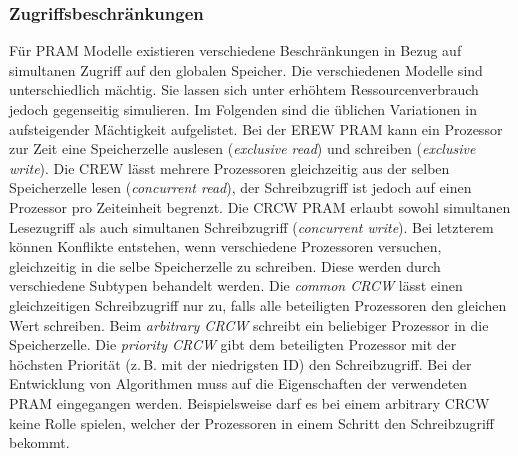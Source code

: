 \subsubsection{Zugriffsbeschränkungen}
Für PRAM Modelle existieren verschiedene Beschränkungen in Bezug auf simultanen Zugriff auf den globalen Speicher.
Die verschiedenen Modelle sind unterschiedlich mächtig. Sie lassen sich unter erhöhtem Ressourcenverbrauch jedoch gegenseitig simulieren.
Im Folgenden sind die üblichen Variationen in aufsteigender Mächtigkeit aufgelistet.
Bei der EREW PRAM kann ein Prozessor zur Zeit eine Speicherzelle auslesen (\emph{exclusive read}) und schreiben (\emph{exclusive write}).
Die CREW lässt mehrere Prozessoren gleichzeitig aus der selben Speicherzelle lesen (\emph{concurrent read}), der Schreibzugriff ist jedoch auf einen Prozessor pro Zeiteinheit begrenzt.
Die CRCW PRAM erlaubt sowohl simultanen Lesezugriff als auch simultanen Schreibzugriff (\emph{concurrent write}).
Bei letzterem können Konflikte entstehen, wenn verschiedene Prozessoren versuchen, gleichzeitig in die selbe Speicherzelle zu schreiben. Diese werden durch verschiedene Subtypen behandelt werden.
Die \emph{common CRCW} lässt einen gleichzeitigen Schreibzugriff nur zu, falls alle beteiligten Prozessoren den gleichen Wert schreiben.
Beim \emph{arbitrary CRCW} schreibt ein beliebiger Prozessor in die Speicherzelle.
Die \emph{priority CRCW} gibt dem beteiligten Prozessor mit der höchsten Priorität (z.\,B. mit der niedrigsten ID) den Schreibzugriff.
Bei der Entwicklung von Algorithmen muss auf die Eigenschaften der verwendeten PRAM eingegangen werden. Beispielsweise darf es bei einem arbitrary CRCW keine Rolle spielen, welcher der Prozessoren in einem Schritt den Schreibzugriff bekommt.
\cite[S.14f.]{jaja}
